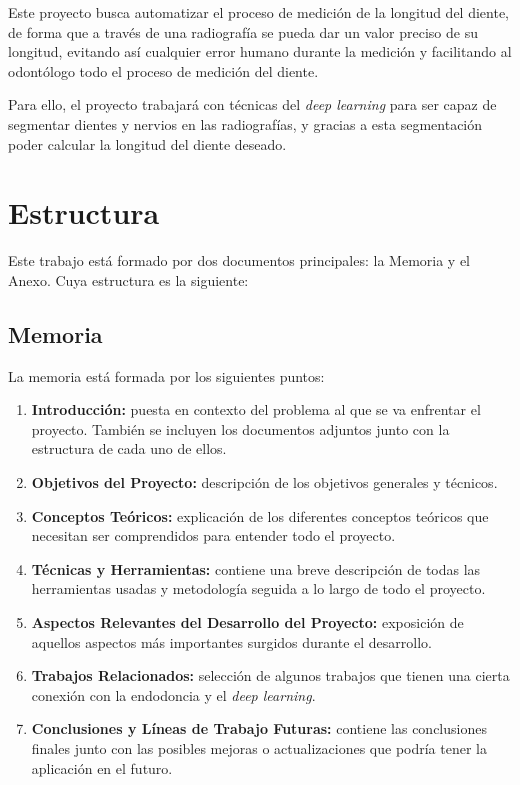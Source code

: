 Este proyecto busca automatizar el proceso de medición de la longitud del diente, de forma que a través de una radiografía se pueda dar un valor preciso de su longitud, evitando así cualquier error humano durante la medición y facilitando al odontólogo todo el proceso de medición del diente.

Para ello, el proyecto trabajará con técnicas del \emph{deep learning} para ser capaz de segmentar dientes y nervios en las radiografías, y gracias a esta segmentación poder calcular la longitud del diente deseado.

\section{Estructura}
Este trabajo está formado por dos documentos principales: la Memoria y el Anexo. Cuya estructura es la siguiente:

\subsection{Memoria}
La memoria está formada por los siguientes puntos:
\begin{enumerate}
    \item \textbf{Introducción:} puesta en contexto del problema al que se va enfrentar el proyecto. También se incluyen los documentos adjuntos junto con la estructura de cada uno de ellos.
    \item \textbf{Objetivos del Proyecto:} descripción de los objetivos generales y técnicos.
    \item \textbf{Conceptos Teóricos:} explicación de los diferentes conceptos teóricos que necesitan ser comprendidos para entender todo el proyecto.
    \item \textbf{Técnicas y Herramientas:} contiene una breve descripción de todas las herramientas usadas y metodología seguida a lo largo de todo el proyecto.
    \item \textbf{Aspectos Relevantes del Desarrollo del Proyecto:} exposición de aquellos aspectos más importantes surgidos durante el desarrollo.
    \item \textbf{Trabajos Relacionados:} selección de algunos trabajos que tienen una cierta conexión con la endodoncia y el \emph{deep learning}.
    \item \textbf{Conclusiones y Líneas de Trabajo Futuras:} contiene las conclusiones finales junto con las posibles mejoras o actualizaciones que podría tener la aplicación en el futuro.
\end{enumerate}

